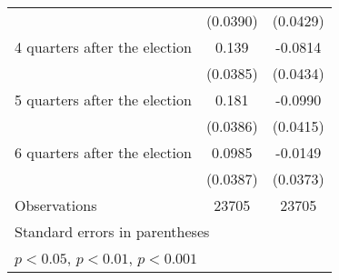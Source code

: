 \begin{table}[htbp]
\begin{tabular}{l*{2}{c}}
                    &    (0.0390)         &    (0.0429)         \\
[1em]
 4 quarters after the election&       0.139\sym{***}&     -0.0814         \\
                    &    (0.0385)         &    (0.0434)         \\
[1em]
 5 quarters after the election&       0.181\sym{***}&     -0.0990\sym{*}  \\
                    &    (0.0386)         &    (0.0415)         \\
[1em]
 6 quarters after the election&      0.0985\sym{*}  &     -0.0149         \\
                    &    (0.0387)         &    (0.0373)         \\
\hline
Observations        &       23705         &       23705         \\
\hline\hline
\multicolumn{3}{l}{\footnotesize Standard errors in parentheses}\\
\multicolumn{3}{l}{\footnotesize \sym{*} \(p<0.05\), \sym{**} \(p<0.01\), \sym{***} \(p<0.001\)}\\
\end{tabular}
\end{table}
